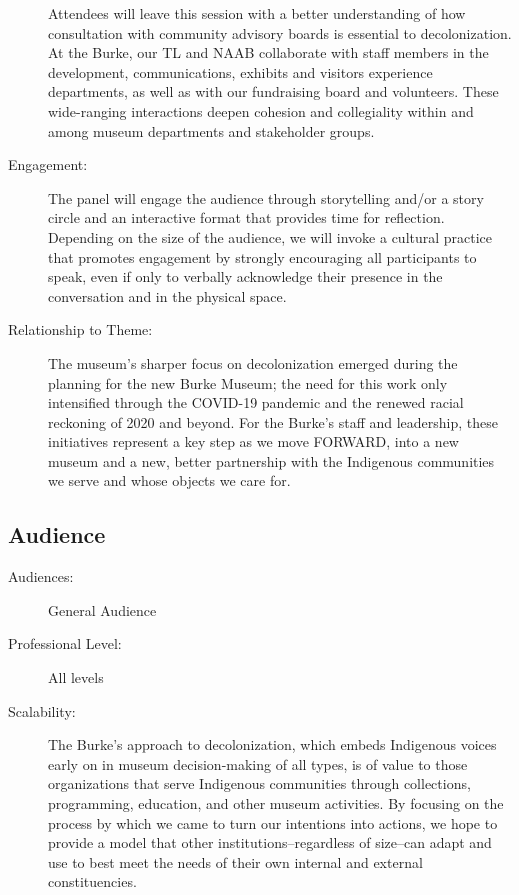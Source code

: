 \documentclass{report}
\begin{document}
\begin{description}
Attendees will leave this session with a better understanding of how consultation with community advisory boards is essential to decolonization. At the Burke, our TL and NAAB collaborate with staff members in the development, communications, exhibits and visitors experience departments, as well as with our fundraising board and volunteers. These wide-ranging interactions deepen cohesion and collegiality within and among museum departments and stakeholder groups.
							    \item [Engagement:]The panel will engage the audience through storytelling and/or a story circle and an interactive format that provides time for reflection. Depending on the size of the audience, we will invoke a cultural practice that promotes engagement by strongly encouraging all participants to speak, even if only to verbally acknowledge their presence in the conversation and in the physical space.
							    \item [Relationship to Theme:]The museum’s sharper focus on decolonization emerged during the planning for the new Burke Museum; the need for this work only intensified through the COVID-19 pandemic and the renewed racial reckoning of 2020 and beyond. For the Burke’s staff and leadership, these initiatives represent a key step as we move FORWARD, into a new museum and a new, better partnership with the Indigenous communities we serve and whose objects we care for.
							    
                \end{description}
              \subsection*{Audience}
                \begin{description}
                  \item [Audiences:]General Audience~
                  \item[Professional Level:]All levels~
                \item[Scalability:] The Burke’s approach to decolonization, which embeds Indigenous voices early on in museum decision-making of all types, is of value to those organizations that serve Indigenous communities through collections, programming, education, and other museum activities. By focusing on the process by which we came to turn our intentions into actions, we hope to provide a model that other institutions--regardless of size--can adapt and use to best meet the needs of their own internal and external constituencies.

							
              \end{description}
\end{document}
